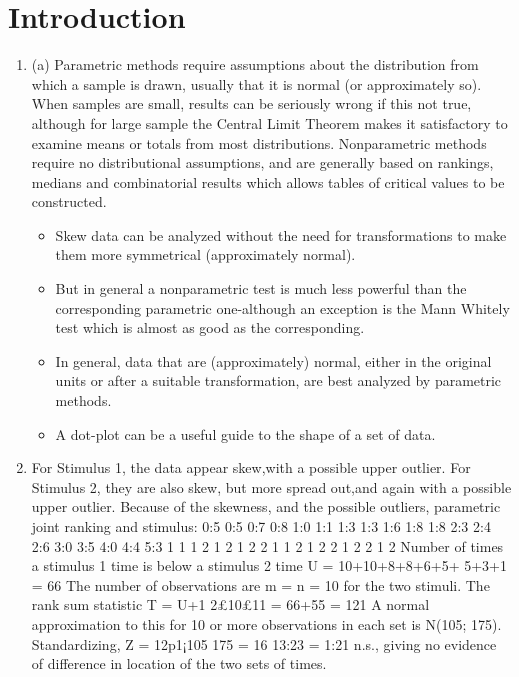 \documentclass[a4paper,12pt]{article}
\begin{document}
\section{Introduction}
\begin{enumerate}
    \item (a) Parametric methods require assumptions about the distribution from which a sample is
drawn, usually that it is normal (or approximately so). When samples are small, results
can be seriously wrong if this not true, although for large sample the Central Limit
Theorem makes it satisfactory to examine means or totals from most distributions.
Nonparametric methods require no distributional assumptions, and are generally based
on rankings, medians and combinatorial results which allows tables of critical values to be constructed.
\begin{itemize}
    \item  Skew data can be analyzed without the need for transformations to make
them more symmetrical (approximately normal). 
\item But in general a nonparametric test is
much less powerful than the corresponding parametric one-although an exception is the
Mann Whitely test which is almost as good as the corresponding.
\item In general, data that are (approximately) normal, either in the original units or after a
suitable transformation, are best analyzed by parametric methods. 
\item A dot-plot can be a
useful guide to the shape of a set of data.
\end{itemize}

\item For Stimulus 1, the data appear skew,with a possible upper outlier. For Stimulus 2, they
are also skew, but more spread out,and again with a possible upper outlier.
Because of the skewness, and the possible outliers, parametric joint ranking and stimulus:
0:5 0:5 0:7 0:8 1:0 1:1 1:3 1:3 1:6 1:8 1:8 2:3 2:4 2:6 3:0 3:5 4:0 4:4 5:3
1 1 1 2 1 2 1 2 2 1 1 2 1 2 2 1 2 2 1 2
Number of times a stimulus 1 time is below a stimulus 2 time U = 10+10+8+8+6+5+
5+3+1 = 66 The number of observations are m = n = 10 for the two stimuli. The rank
sum statistic T = U+1
2£10£11 = 66+55 = 121 A normal approximation to this for 10 or
more observations in each set is N(105; 175). Standardizing, Z = 12p1¡105
175
= 16
13:23 = 1:21
n.s., giving no evidence of difference in location of the two sets of times.

\end{enumerate}
\end{document}
